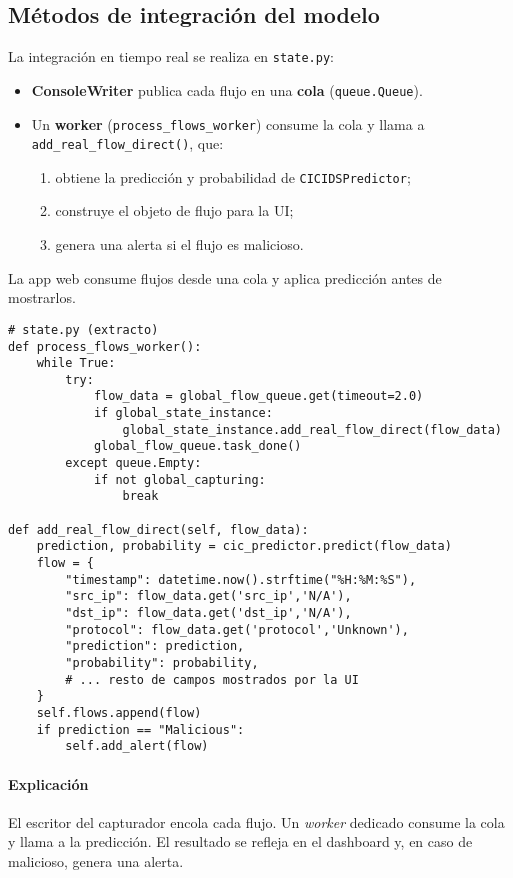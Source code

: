 \subsection{Métodos de integración del modelo}
La integración en tiempo real se realiza en \texttt{state.py}:
\begin{itemize}
  \item \textbf{ConsoleWriter} publica cada flujo en una \textbf{cola} (\texttt{queue.Queue}).
  \item Un \textbf{worker} (\texttt{process\_flows\_worker}) consume la cola y llama a \texttt{add\_real\_flow\_direct()}, que:
  \begin{enumerate}
    \item obtiene la predicción y probabilidad de \texttt{CICIDSPredictor};
    \item construye el objeto de flujo para la UI;
    \item genera una alerta si el flujo es malicioso.
  \end{enumerate}
\end{itemize}

La app web consume flujos desde una cola y aplica predicción antes de mostrarlos.

\begin{lstlisting}[style=tfgpython,caption={Worker de procesamiento y aplicación de la IA (extracto)},label=List.Worker]
# state.py (extracto)
def process_flows_worker():
    while True:
        try:
            flow_data = global_flow_queue.get(timeout=2.0)
            if global_state_instance:
                global_state_instance.add_real_flow_direct(flow_data)
            global_flow_queue.task_done()
        except queue.Empty:
            if not global_capturing:
                break

def add_real_flow_direct(self, flow_data):
    prediction, probability = cic_predictor.predict(flow_data)
    flow = {
        "timestamp": datetime.now().strftime("%H:%M:%S"),
        "src_ip": flow_data.get('src_ip','N/A'),
        "dst_ip": flow_data.get('dst_ip','N/A'),
        "protocol": flow_data.get('protocol','Unknown'),
        "prediction": prediction,
        "probability": probability,
        # ... resto de campos mostrados por la UI
    }
    self.flows.append(flow)
    if prediction == "Malicious":
        self.add_alert(flow)
\end{lstlisting}
\paragraph{Explicación}
El escritor del capturador encola cada flujo. Un \emph{worker} dedicado consume la cola y llama a la predicción. El resultado se refleja en el dashboard y, en caso de malicioso, genera una alerta.


